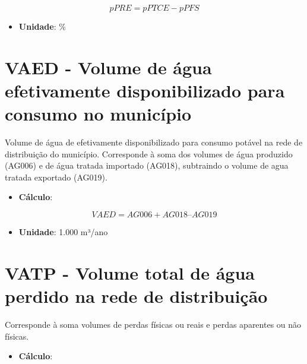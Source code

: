\documentclass[]{book}
\providecommand{\tightlist}{%
  \setlength{\itemsep}{0pt}\setlength{\parskip}{0pt}}
\begin{document}
\[
pPRE = pPTCE - pPFS
\]

\begin{itemize}
\tightlist
\item
  \textbf{Unidade}: \%
\end{itemize}

\hypertarget{vaed---volume-de-uxe1gua-efetivamente-disponibilizado-para-consumo-no-municuxedpio}{%
\section*{VAED - Volume de água efetivamente disponibilizado para consumo no município}\label{vaed---volume-de-uxe1gua-efetivamente-disponibilizado-para-consumo-no-municuxedpio}}

Volume de água de efetivamente disponibilizado para consumo potável na rede de distribuição do município. Corresponde à soma dos volumes de água produzido (AG006) e de água tratada importado (AG018), subtraindo o volume de agua tratada exportado (AG019).

\begin{itemize}
\tightlist
\item
  \textbf{Cálculo}:
\end{itemize}

\[
VAED = AG006 + AG018 – AG019
\]

\begin{itemize}
\tightlist
\item
  \textbf{Unidade}: 1.000 m³/ano
\end{itemize}

\hypertarget{vatp---volume-total-de-uxe1gua-perdido-na-rede-de-distribuiuxe7uxe3o}{%
\section*{VATP - Volume total de água perdido na rede de distribuição}\label{vatp---volume-total-de-uxe1gua-perdido-na-rede-de-distribuiuxe7uxe3o}}

Corresponde à soma volumes de perdas físicas ou reais e perdas aparentes ou não físicas.

\begin{itemize}
\tightlist
\item
  \textbf{Cálculo}:
\end{itemize}
\end{document}
